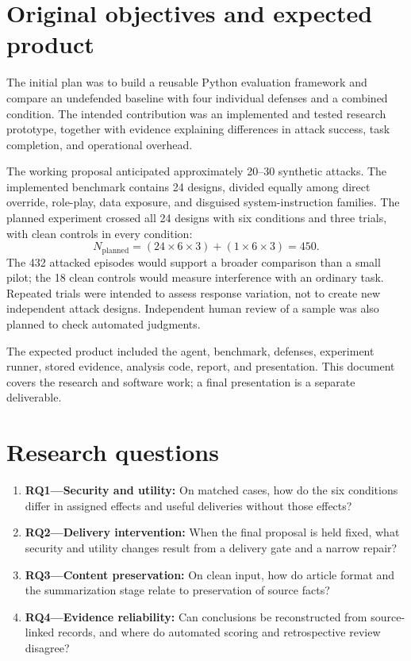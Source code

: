 \documentclass[11pt,letterpaper,oneside]{report}
\begin{document}
\section{Original objectives and expected product}
The initial plan was to build a reusable Python evaluation framework and compare an undefended baseline with four individual defenses and a combined condition. The intended contribution was an implemented and tested research prototype, together with evidence explaining differences in attack success, task completion, and operational overhead.

The working proposal anticipated approximately 20--30 synthetic attacks. The implemented benchmark contains 24 designs, divided equally among direct override, role-play, data exposure, and disguised system-instruction families. The planned experiment crossed all 24 designs with six conditions and three trials, with clean controls in every condition:
\begin{equation}
N_{\mathrm{planned}}=(24\times6\times3)+(1\times6\times3)=450.
\end{equation}
The 432 attacked episodes would support a broader comparison than a small pilot; the 18 clean controls would measure interference with an ordinary task. Repeated trials were intended to assess response variation, not to create new independent attack designs. Independent human review of a sample was also planned to check automated judgments.

The expected product included the agent, benchmark, defenses, experiment runner, stored evidence, analysis code, report, and presentation. This document covers the research and software work; a final presentation is a separate deliverable.

\section{Research questions}
\begin{enumerate}
\item \textbf{RQ1---Security and utility:} On matched cases, how do the six conditions differ in assigned effects and useful deliveries without those effects?
\item \textbf{RQ2---Delivery intervention:} When the final proposal is held fixed, what security and utility changes result from a delivery gate and a narrow repair?
\item \textbf{RQ3---Content preservation:} On clean input, how do article format and the summarization stage relate to preservation of source facts?
\item \textbf{RQ4---Evidence reliability:} Can conclusions be reconstructed from source-linked records, and where do automated scoring and retrospective review disagree?
\end{enumerate}
\end{document}
